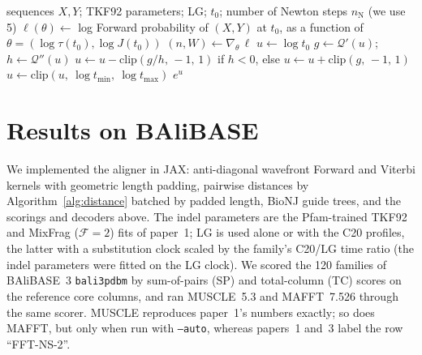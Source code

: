 \documentclass[11pt]{article}
\begin{document}
\begin{algorithm}[tbp]
\caption{Pairwise distance by one EM iteration}
\label{alg:distance}
\begin{algorithmic}[1]
\Require sequences $X,Y$; TKF92 parameters; LG; $t_0$;
  number of Newton steps $n_{\mathrm{N}}$ (we use 5)
  \State $\ell(\theta)\gets$ log Forward probability of $(X,Y)$ at $t_0$, as a
    function of $\theta=(\log\tau(t_0),\log J(t_0))$
  \State $(n,W)\gets\nabla_\theta\,\ell$ 
  \State $u\gets\log t_0$
    \State $g\gets\mathcal Q'(u)$;\quad $h\gets\mathcal Q''(u)$
    \State $u\gets u-\mathrm{clip}(g/h,\,-1,\,1)$ if $h<0$, else
      $u\gets u+\mathrm{clip}(g,\,-1,\,1)$
    \State $u\gets\mathrm{clip}(u,\ \log t_{\min},\ \log t_{\max})$
  \EndFor
  \State \Return $e^u$
\EndFunction
\end{algorithmic}
\end{algorithm}

\section{Results on BAliBASE}
\label{sec:results}

We implemented the aligner in JAX: anti-diagonal wavefront Forward and Viterbi
kernels with geometric length padding, pairwise distances by
Algorithm~\ref{alg:distance} batched by padded length, BioNJ guide trees, and
the scorings and decoders above. The indel parameters are the Pfam-trained
TKF92 and MixFrag ($\mathcal F=2$) fits of paper~1; LG is used alone or with
the C20 profiles, the latter with a substitution clock scaled by the family's
C20/LG time ratio (the indel parameters were fitted on the LG clock). We scored
the 120 families of BAliBASE~3 \texttt{bali3pdbm} by sum-of-pairs (SP) and
total-column (TC) scores on the reference core columns, and ran MUSCLE~5.3 and
MAFFT~7.526 through the same scorer. MUSCLE reproduces paper~1's numbers
exactly; so does MAFFT, but only when run with \texttt{--auto}, whereas papers~1
and~3 label the row ``FFT-NS-2''.
\end{document}

